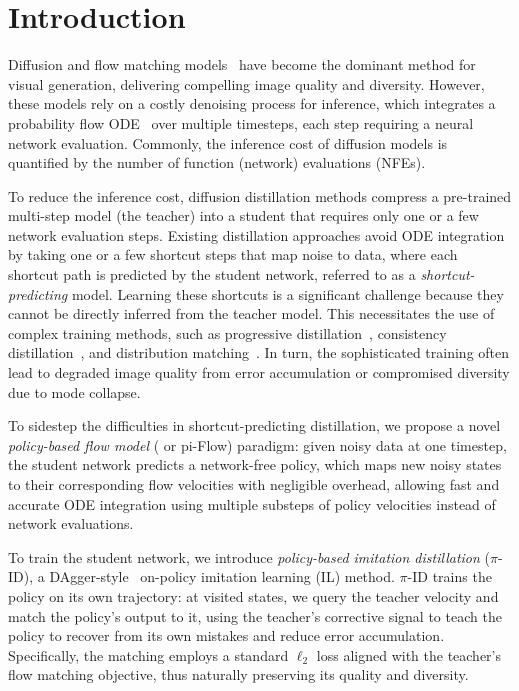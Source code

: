 \section{Introduction}
Diffusion and flow matching models~\citep{sohl2015deep,ddpm,song2019score,lipman2023flow,albergo2023building} have become 
the dominant method for visual generation, delivering compelling image quality and diversity. 
However, these models rely on a costly denoising process for inference, which integrates a probability flow ODE~\citep{song2021scorebased} over multiple timesteps, each step requiring a neural network evaluation. Commonly, the inference cost of diffusion models is quantified by the number of function (network) evaluations (NFEs).

To reduce the inference cost, diffusion distillation methods compress a pre-trained multi-step model (the teacher) into a 
student that requires only one or a few network evaluation steps.
Existing distillation approaches avoid ODE integration by taking one or a few shortcut steps that map noise to data, where each shortcut path is predicted by the student network, referred to as a \emph{shortcut-predicting} model. 
Learning these shortcuts is a significant challenge because they cannot be directly inferred from the teacher model. This necessitates the use of complex training methods, such as progressive distillation~\citep{salimans2022progressive, liu2022flow, instaflow}, consistency distillation~\citep{consistencymodels}, and distribution matching~\citep{ladd,yin2024onestep,yin2024improved,salimans2024multistep}. In turn, the sophisticated training often lead to degraded image quality from error accumulation or compromised diversity due to mode collapse. 

To sidestep the difficulties in shortcut-predicting distillation, we propose a novel \emph{policy-based flow model} (\methodname{} or pi-Flow) paradigm: 
given noisy data at one timestep, the student network predicts a network-free policy, which maps new noisy states to their corresponding flow velocities with negligible overhead, allowing fast and accurate ODE integration using multiple substeps of policy velocities instead of network evaluations. 

To train the student network, we introduce \emph{policy-based imitation distillation} ($\pi$-ID), a DAgger-style~\citep{dagger} on-policy imitation learning (IL) method. $\pi$-ID trains the policy on its own trajectory: at visited states, we query the teacher velocity and match the policy's output to it, using the teacher’s corrective signal to teach the policy to recover from its own mistakes and reduce error accumulation. Specifically, the matching employs a standard $\ell_2$ loss aligned with the teacher’s flow matching objective, thus naturally preserving its quality and diversity.

